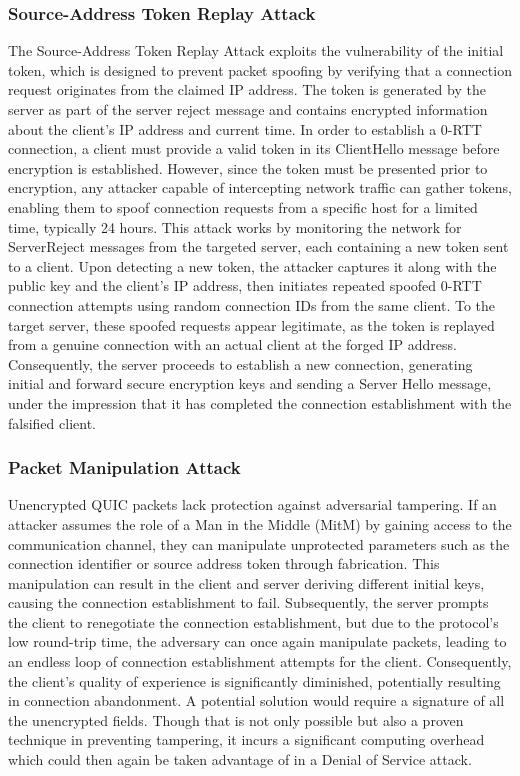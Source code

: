 \subsubsection{Source-Address Token Replay Attack}

The Source-Address Token Replay Attack exploits the vulnerability of the initial token, which is designed to prevent packet spoofing
by verifying that a connection request originates from the claimed IP address. The token is generated by the server as part of the
server reject message and contains encrypted information about the client's IP address and current time. In order to establish a
0-RTT connection, a client must provide a valid token in its 
ClientHello message before encryption is established.
However, since the token must be presented prior to encryption, any attacker capable of intercepting network traffic can gather
tokens, enabling them to spoof connection requests from a specific host for a limited time, typically 24 hours. This attack works
by monitoring the network for ServerReject messages from the targeted server, each containing a new token sent to a client. Upon
detecting a new token, the attacker captures it along with the public key and the client's IP address, then initiates repeated
spoofed 0-RTT connection attempts using random connection IDs from the same client.
To the target server, these spoofed requests appear legitimate, as the token is replayed from a genuine connection with an actual
client at the forged IP address. Consequently, the server proceeds to establish a new connection, generating initial and forward
secure encryption keys and sending a Server Hello message, under the impression that it has completed the connection establishment
with the falsified client.

\subsubsection{Packet Manipulation Attack}

Unencrypted QUIC packets lack protection against adversarial tampering. If an attacker assumes the role of a Man in the Middle (MitM)
by gaining access to the communication channel, they can manipulate unprotected parameters such as the connection identifier or
source address token through fabrication. This manipulation can result in the client and server deriving different initial keys,
causing the connection establishment to fail. Subsequently, the server prompts the client to renegotiate the connection
establishment, but due to the protocol's low round-trip time, the adversary can once again manipulate packets, leading to an
endless loop of connection establishment attempts for the client. Consequently, the client's quality of experience is
significantly diminished, potentially resulting in connection abandonment.
A potential solution would require a signature of all the unencrypted fields. Though that is not only possible but also a proven
technique in preventing tampering, it incurs a significant computing overhead which could then again be taken advantage of in a
Denial of Service attack.


